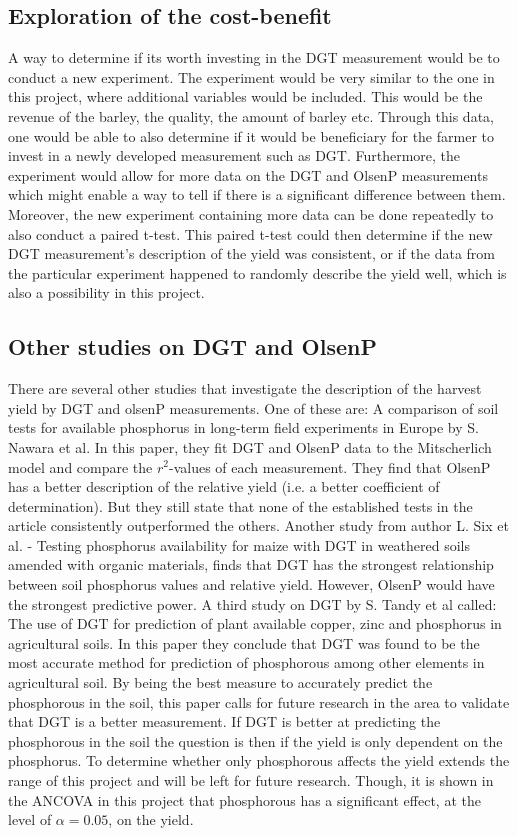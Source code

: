 \documentclass[11pt, fleqn, titlepage]{article}
\begin{document}
\subsection*{Exploration of the cost-benefit }
A way to determine if its worth investing in the DGT measurement would be to conduct a new experiment. The experiment would be very similar to the one in this project, where additional variables would be included. This would be the revenue of the barley, the quality, the amount of barley etc. Through this data, one would be able to also determine if it would be beneficiary for the farmer to invest in a newly developed measurement such as DGT. Furthermore, the experiment would allow for more data on the DGT and OlsenP measurements which might enable a way to tell if there is a significant difference between them. Moreover, the new experiment containing more data can be done repeatedly to also conduct a paired t-test. This paired t-test could then determine if the new DGT measurement's description of the yield was consistent, or if the data from the particular experiment happened to randomly describe the yield well, which is also a possibility in this project. 

\subsection*{Other studies on DGT and OlsenP}
There are several other studies that investigate the description of the harvest yield by DGT and olsenP measurements. One of these are: A comparison of soil tests for available phosphorus in  long-term field experiments in Europe by S. Nawara et al. In this paper, they fit DGT and OlsenP data to the Mitscherlich model and compare the $ r^2 $-values of each measurement. They find that OlsenP has a better description of the relative yield (i.e. a better coefficient of determination). But they still state that none of the established tests in the article consistently outperformed the others.  \cite{article1} Another study from author L. Six et al. - Testing phosphorus availability for maize with DGT in weathered soils amended with organic materials, finds that DGT has the strongest relationship between soil phosphorus values and relative yield. However, OlsenP would have the strongest predictive power. \cite{article2} A third study on DGT by S. Tandy et al called: The use of DGT for prediction of plant available copper, zinc and phosphorus in agricultural soils. In this paper they conclude that DGT was found to be the most accurate method for prediction of phosphorous among  other elements in agricultural soil. By being the best measure to accurately predict the phosphorous in the soil, this paper calls for future research in the area to validate that DGT is a better measurement. \cite{article3} If DGT is better at predicting the phosphorous in the soil the question is then if the yield is only dependent on the phosphorus. To determine whether only phosphorous affects the yield extends the range of this project and will be left for future research. Though, it is shown in the ANCOVA in this project that phosphorous has a significant effect, at the level of $ \alpha=0.05 $, on the yield. 
\end{document}

